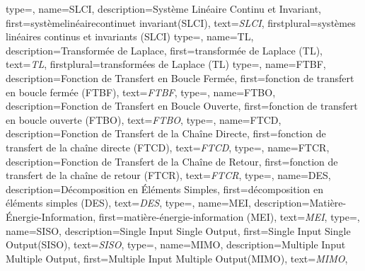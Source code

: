{%
  type=\acronymtype,%
  name={SLCI},%
  description={Système Linéaire Continu et Invariant},%
  first={système\-lin\-éaire\-con\-tinu\-et\- in\-va\-riant\-(SLCI)},%
  text={\emph{{\scshape SLCI}}},%
  firstplural={systèmes\- linéaires\- continus\- et\- invariants\- (SLCI)}%
}
{%
  type=\acronymtype,%
  name={TL},%
  description={Transformée de Laplace},%
  first={transformée de Laplace (TL)},%
  text={\emph{{\scshape TL}}},%
  firstplural={transformées de Laplace (TL)}%
}
{%
  type=\acronymtype,%
  name={FTBF},%
  description={Fonction de Transfert en Boucle Fermée},%
  first={fonction de transfert en boucle fermée (FTBF)},%
  text={\emph{{\scshape FTBF}}},%
}
{%
  type=\acronymtype,%
  name={FTBO},%
  description={Fonction de Transfert en Boucle Ouverte},%
  first={fonction de transfert en boucle ouverte (FTBO)},%
  text={\emph{{\scshape FTBO}}},%
}
{%
  type=\acronymtype,%
  name={FTCD},%
  description={Fonction de Transfert de la Chaîne Directe},%
  first={fonction de transfert de la chaîne directe (FTCD)},%
  text={\emph{{\scshape FTCD}}},%
}
{%
  type=\acronymtype,%
  name={FTCR},%
  description={Fonction de Transfert de la Chaîne de Retour},%
  first={fonction de transfert de la chaîne de retour (FTCR)},%
  text={\emph{{\scshape FTCR}}},%
}
{%
  type=\acronymtype,%
  name={DES},%
  description={Décomposition en \'Eléments Simples},%
  first={dé\-compo\-sition\- en\- éléments\- simples\- (DES)},%
  text={\emph{{\scshape DES}}},%
}
{%
  type=\acronymtype,%
  name={MEI},%
  description={Matière-\'Energie-Information},%
  first={matière-énergie-information (MEI)},%
  text={\emph{{\scshape MEI}}},%
}
{%
  type=\acronymtype,%
  name={SISO},%
  description={Single Input Single Output},%
  first={\og Single Input Single Output\fg (SISO)},%
  text={\emph{{\scshape SISO}}},%
}
{%
  type=\acronymtype,%
  name={MIMO},%
  description={Multiple Input Multiple Output},%
  first={\og Multiple Input Multiple Output\fg (MIMO)},%
  text={\emph{{\scshape MIMO}}},%
}
